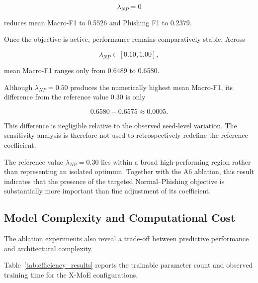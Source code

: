 \documentclass{ieeeaccess}
\begin{document}
\begin{equation}
\lambda_{NP}=0
\end{equation}

reduces mean Macro-F1 to 0.5526 and Phishing F1 to 0.2379.

Once the objective is active, performance remains comparatively stable. Across

\begin{equation}
\lambda_{NP}\in[0.10,1.00],
\end{equation}

mean Macro-F1 ranges only from 0.6489 to 0.6580.

Although \(\lambda_{NP}=0.50\) produces the numerically highest mean Macro-F1, its difference from the reference value 0.30 is only

\begin{equation}
0.6580-0.6575\approx0.0005.
\end{equation}

This difference is negligible relative to the observed seed-level variation. The sensitivity analysis is therefore not used to retrospectively redefine the reference coefficient.

The reference value \(\lambda_{NP}=0.30\) lies within a broad high-performing region rather than representing an isolated optimum. Together with the A6 ablation, this result indicates that the presence of the targeted Normal--Phishing objective is substantially more important than fine adjustment of its coefficient.


\subsection{Model Complexity and Computational Cost}

The ablation experiments also reveal a trade-off between predictive performance and architectural complexity.

Table~\ref{tab:efficiency_results} reports the trainable parameter count and observed training time for the X-MoE configurations.
\end{document}
